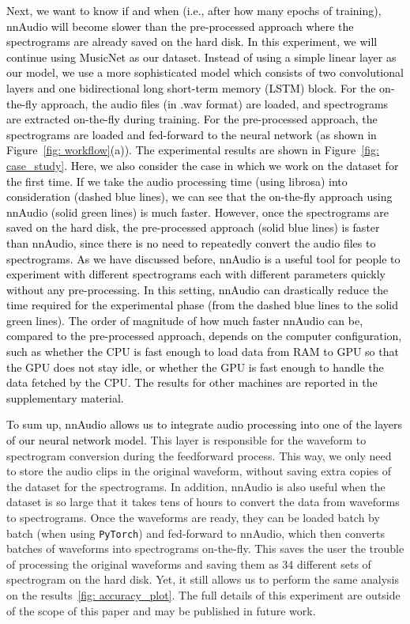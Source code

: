\documentclass{ieeeaccess}
\newcommand{\nbh}[1]{\texttt{#1}}
\newcommand{\newtext}[1]{\textcolor{black}{#1}} %
\begin{document}
\newtext{Next, we want to know if and when (i.e., after how many epochs of training), nnAudio will become slower than the pre-processed approach where the spectrograms are already saved on the hard disk. In this experiment, we will continue using MusicNet as our dataset. Instead of using a simple linear layer as our model, we use a more sophisticated model which consists of two convolutional layers and one bidirectional long short-term memory (LSTM) block. For the on-the-fly approach, the audio files (in .wav format) are loaded, and spectrograms are extracted on-the-fly during training. For the pre-processed approach, the spectrograms are loaded and fed-forward to the neural network (as shown in Figure~\ref{fig: workflow}(a)). The experimental results are shown in Figure~\ref{fig: case_study}. Here, we also consider the case in which we work on the dataset for the first time. If we take the audio processing time (using librosa) into consideration (dashed blue lines), we can see that the on-the-fly approach using nnAudio (solid green lines) is much faster. However, once the spectrograms are saved on the hard disk, the pre-processed approach (solid blue lines) is faster than nnAudio, since there is no need to repeatedly convert the audio files to spectrograms. As we have discussed before,  nnAudio is a useful tool for people to experiment with different spectrograms each with different parameters quickly without any pre-processing. In this setting, nnAudio can drastically reduce the time required for the experimental phase (from the dashed blue lines to the solid green lines). The order of magnitude of how much faster nnAudio can be, compared to the pre-processed approach, depends on the computer configuration, such as whether the CPU is fast enough to load data from RAM to GPU so that the GPU does not stay idle, or whether the GPU is fast enough to handle the data fetched by the CPU. The results for other machines are reported in the supplementary material.}

\newtext{To sum up, nnAudio allows us to integrate audio processing into one of the layers of our neural network model.} This layer is responsible for the waveform to spectrogram conversion during the feedforward process. This way, we only need to store the audio clips in the original waveform, without saving extra copies of the dataset for the spectrograms. In addition, nnAudio is also useful when the dataset is so large that it takes tens of hours to convert the data from waveforms to spectrograms. Once the waveforms are ready, they can be loaded batch by batch (when using \nbh{PyTorch}) and fed-forward to nnAudio, which then converts batches of waveforms into spectrograms on-the-fly. This saves the user the trouble of processing the original waveforms and saving them as 34 different sets of spectrogram on the hard disk. Yet, it still allows us to perform the same analysis on the results~\ref{fig: accuracy_plot}. The full details of this experiment are outside of the scope of this paper and may be published in future work. 
\end{document}
